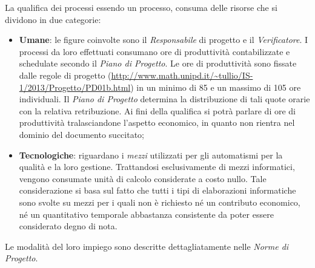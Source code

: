 	La qualifica dei processi essendo un processo, consuma delle risorse che si dividono in due categorie:
		\begin{itemize}
  			\item \textbf{Umane}: le figure coinvolte sono il \emph{Responsabile} di progetto e il \emph{Verificatore}. I processi da loro effettuati consumano ore di produttività contabilizzate e schedulate secondo il \emph{Piano di Progetto}. Le ore di produttività sono fissate dalle regole di progetto (\url{http://www.math.unipd.it/~tullio/IS-1/2013/Progetto/PD01b.html}) in un minimo di 85 e un massimo di 105 ore individuali. Il \emph{Piano di Progetto} determina la distribuzione di tali quote orarie con la relativa retribuzione. Ai fini della qualifica si potrà parlare di ore di produttività tralasciandone l'aspetto economico, in quanto non rientra nel dominio del documento succitato; 
  			
  			\item \textbf{Tecnologiche}: riguardano i \emph{mezzi} utilizzati per gli automatismi per la qualità e la loro gestione. Trattandosi esclusivamente di mezzi informatici, vengono consumate unità di calcolo considerate a costo nullo. Tale considerazione si basa sul fatto che tutti i tipi di elaborazioni informatiche sono svolte su mezzi per i quali non è richiesto né un contributo economico, né un quantitativo temporale abbastanza consistente da poter essere considerato degno di nota.
		\end{itemize}
		
	Le modalità del loro impiego sono descritte dettagliatamente nelle \emph{Norme di Progetto}.
	
		

\iffalse		%

